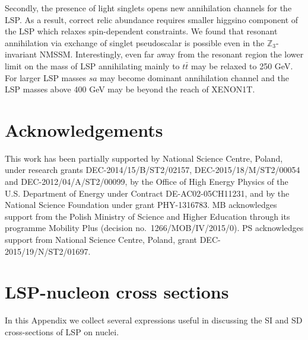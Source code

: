 \documentclass[12pt,twoside]{article}
\begin{document}
Secondly, the presence of light singlets opens new annihilation channels for the LSP. As a result, correct relic abundance requires smaller higgsino
component of the LSP which relaxes spin-dependent constraints. We found that  resonant annihilation via
exchange of singlet pseudoscalar is possible even in the $\mathbb{Z}_3$-invariant NMSSM. Interestingly, even far away from the resonant region the
lower limit on the mass of LSP annihilating mainly to $t\bar{t}$ may be relaxed to 250 GeV. For larger LSP masses $sa$ may become dominant
annihilation channel and the LSP masses above 400 GeV may be beyond the reach of XENON1T. 



\section*{Acknowledgements}

This work has been partially supported by National Science Centre,
Poland, under research grants DEC-2014/15/B/ST2/02157,
DEC-2015/18/M/ST2/00054 and DEC-2012/04/A/ST2/00099, 
by the Office of High Energy Physics of the U.S. Department of Energy
under Contract DE-AC02-05CH11231, and by the National Science Foundation
under grant PHY-1316783. MB acknowledges support from the Polish 
Ministry of Science and Higher Education through its programme Mobility Plus (decision no.\ 1266/MOB/IV/2015/0).
PS acknowledges support from National Science Centre, Poland, 
grant DEC-2015/19/N/ST2/01697.

\appendix


\section{LSP-nucleon cross sections}
\label{App:cross-sections}

In this Appendix we collect several expressions useful 
in discussing the SI and SD cross-sections of LSP on nuclei.
\end{document}
